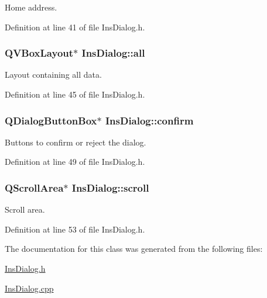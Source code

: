 Home address. 



Definition at line 41 of file Ins\+Dialog.\+h.

\hypertarget{class_ins_dialog_ab8de5f3cd72b44a3b3524fc52bac148c}{
\subsubsection[{all}]{\setlength{\rightskip}{0pt plus 5cm}Q\+V\+Box\+Layout$\ast$ Ins\+Dialog\+::all\hspace{0.3cm}{\ttfamily [private]}}}\label{class_ins_dialog_ab8de5f3cd72b44a3b3524fc52bac148c}


Layout containing all data. 



Definition at line 45 of file Ins\+Dialog.\+h.

\hypertarget{class_ins_dialog_aa77dfa096f7cd3bc82823f6944ecbd8b}{
\subsubsection[{confirm}]{\setlength{\rightskip}{0pt plus 5cm}Q\+Dialog\+Button\+Box$\ast$ Ins\+Dialog\+::confirm\hspace{0.3cm}{\ttfamily [private]}}}\label{class_ins_dialog_aa77dfa096f7cd3bc82823f6944ecbd8b}


Buttons to confirm or reject the dialog. 



Definition at line 49 of file Ins\+Dialog.\+h.

\hypertarget{class_ins_dialog_a822e0887cf9597f75ed5c4a772a8c9db}{
\subsubsection[{scroll}]{\setlength{\rightskip}{0pt plus 5cm}Q\+Scroll\+Area$\ast$ Ins\+Dialog\+::scroll\hspace{0.3cm}{\ttfamily [private]}}}\label{class_ins_dialog_a822e0887cf9597f75ed5c4a772a8c9db}


Scroll area. 



Definition at line 53 of file Ins\+Dialog.\+h.



The documentation for this class was generated from the following files\+:\begin{DoxyCompactItemize}
\item 
\hyperlink{_ins_dialog_8h}{Ins\+Dialog.\+h}\item 
\hyperlink{_ins_dialog_8cpp}{Ins\+Dialog.\+cpp}\end{DoxyCompactItemize}
